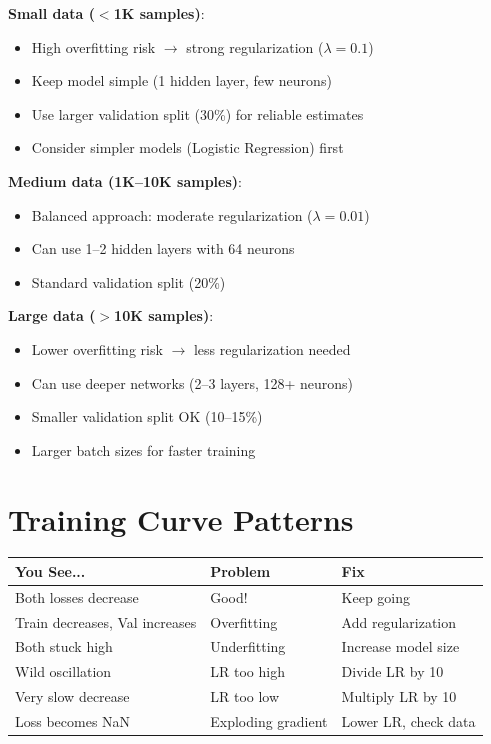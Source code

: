 \documentclass[11pt,a4paper]{article}
\begin{document}
\begin{notebox}

\textbf{Small data ($<$1K samples)}:
\begin{itemize}[leftmargin=*,nosep]
\item High overfitting risk $\to$ strong regularization ($\lambda = 0.1$)
\item Keep model simple (1 hidden layer, few neurons)
\item Use larger validation split (30\%) for reliable estimates
\item Consider simpler models (Logistic Regression) first
\end{itemize}

\textbf{Medium data (1K--10K samples)}:
\begin{itemize}[leftmargin=*,nosep]
\item Balanced approach: moderate regularization ($\lambda = 0.01$)
\item Can use 1--2 hidden layers with 64 neurons
\item Standard validation split (20\%)
\end{itemize}

\textbf{Large data ($>$10K samples)}:
\begin{itemize}[leftmargin=*,nosep]
\item Lower overfitting risk $\to$ less regularization needed
\item Can use deeper networks (2--3 layers, 128+ neurons)
\item Smaller validation split OK (10--15\%)
\item Larger batch sizes for faster training
\end{itemize}
\end{notebox}

\section{Training Curve Patterns}

\begin{warningbox}

\begin{tabular}{@{}l|l|l@{}}
\textbf{You See...} & \textbf{Problem} & \textbf{Fix} \\
\hline
Both losses decrease & Good! & Keep going \\
Train decreases, Val increases & Overfitting & Add regularization \\
Both stuck high & Underfitting & Increase model size \\
Wild oscillation & LR too high & Divide LR by 10 \\
Very slow decrease & LR too low & Multiply LR by 10 \\
Loss becomes NaN & Exploding gradient & Lower LR, check data \\
\end{tabular}
\end{warningbox}
\end{document}
